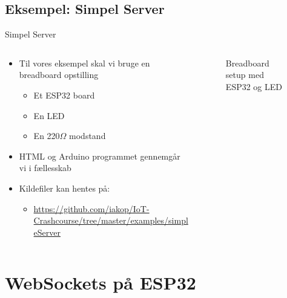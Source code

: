 \documentclass[aspectratio=169]{beamer}
\begin{document}
\subsection{Eksempel: Simpel Server}
\begin{frame}{Simpel Server}
\begin{columns}
	\begin{column}{0.6\textwidth}
		\begin{textBox}
		\begin{itemize}
			\item Til vores eksempel skal vi bruge en breadboard opstilling
			\begin{itemize}
				\item Et ESP32 board
				\item En LED
				\item En 220{\textsf{$\Omega$}} modstand
			\end{itemize}
			\item HTML og Arduino programmet gennemgår vi i fællesskab
			\item Kildefiler kan hentes på:
			\begin{itemize}
				\item \tiny\url{https://github.com/iakop/IoT-Crashcourse/tree/master/examples/simpleServer}
			\end{itemize}
		\end{itemize}
		\end{textBox}
	\end{column}
	\begin{column}{0.4\textwidth}
		\centering
		\begin{figure}
  			
  			\caption{Breadboard setup med ESP32 og LED}
  			\label{fig:esp32-led}
		\end{figure}
	\end{column}
\end{columns}
\end{frame}

\section{WebSockets på ESP32}
\begin{frame}
\end{frame}
\end{document}
